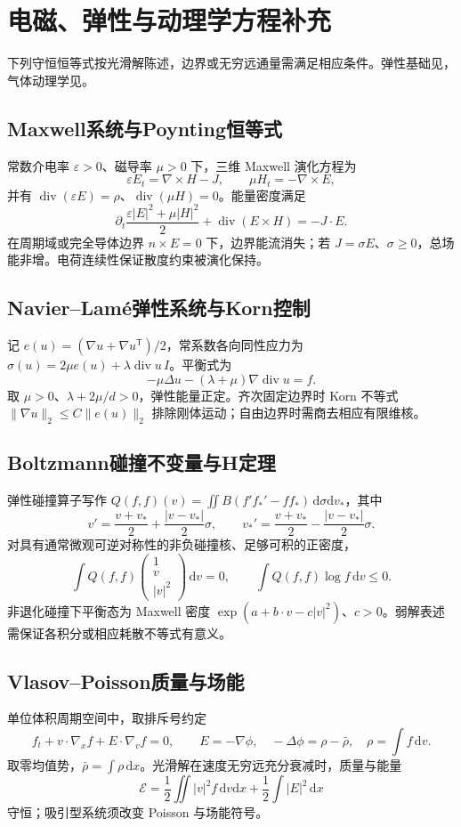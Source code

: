\documentclass[../main.tex]{subfiles}
\begin{document}
\section{电磁、弹性与动理学方程补充}
下列守恒恒等式按光滑解陈述，边界或无穷远通量需满足相应条件。弹性基础见\cite{variation}，气体动理学见\cite{kinetic}。
\subsection{Maxwell系统与Poynting恒等式}
常数介电率 $\varepsilon>0$、磁导率 $\mu>0$ 下，三维 Maxwell 演化方程为
\[
\varepsilon E_t=\nabla\times H-J,\qquad
\mu H_t=-\nabla\times E,
\]
并有 $\operatorname{div}(\varepsilon E)=\rho$、$\operatorname{div}(\mu H)=0$。能量密度满足
\[
\partial_t\frac{\varepsilon|E|^2+\mu|H|^2}{2}
+\operatorname{div}(E\times H)=-J\cdot E.
\]
在周期域或完全导体边界 $n\times E=0$ 下，边界能流消失；若 $J=\sigma E$、$\sigma\ge0$，总场能非增。电荷连续性保证散度约束被演化保持。
\subsection{Navier--Lamé弹性系统与Korn控制}
记 $e(u)=(\nabla u+\nabla u^{\mathsf T})/2$，常系数各向同性应力为 $\sigma(u)=2\mu e(u)+\lambda\operatorname{div}u\,I$。平衡式为
\[
-\mu\Delta u-(\lambda+\mu)\nabla\operatorname{div}u=f.
\]
取 $\mu>0$、$\lambda+2\mu/d>0$，弹性能量正定。齐次固定边界时 Korn 不等式 $\|\nabla u\|_2\le C\|e(u)\|_2$ 排除刚体运动；自由边界时需商去相应有限维核。
\subsection{Boltzmann碰撞不变量与H定理}
弹性碰撞算子写作 $Q(f,f)(v)=\iint B(f'f_*'-ff_*)\,\mathrm d\sigma\mathrm dv_*$，其中
\[
v'=\frac{v+v_*}{2}+\frac{|v-v_*|}{2}\sigma,\qquad
v_*'=\frac{v+v_*}{2}-\frac{|v-v_*|}{2}\sigma.
\]
对具有通常微观可逆对称性的非负碰撞核、足够可积的正密度，
\[
\int Q(f,f)\begin{pmatrix}1\\v\\|v|^2\end{pmatrix}\,\mathrm dv=0,
\qquad \int Q(f,f)\log f\,\mathrm dv\le0.
\]
非退化碰撞下平衡态为 Maxwell 密度 $\exp(a+b\cdot v-c|v|^2)$、$c>0$。弱解表述需保证各积分或相应耗散不等式有意义。
\newpage
\subsection{Vlasov--Poisson质量与场能}
单位体积周期空间中，取排斥号约定
\[
f_t+v\cdot\nabla_xf+E\cdot\nabla_vf=0,\qquad
E=-\nabla\phi,\quad-\Delta\phi=\rho-\bar\rho,\quad
\rho=\int f\,\mathrm dv.
\]
取零均值势，$\bar\rho=\int\rho\,\mathrm dx$。光滑解在速度无穷远充分衰减时，质量与能量
\[
\mathcal E=\frac12\iint |v|^2f\,\mathrm dv\mathrm dx
+\frac12\int|E|^2\,\mathrm dx
\]
守恒；吸引型系统须改变 Poisson 与场能符号。
\clearpage
\end{document}
